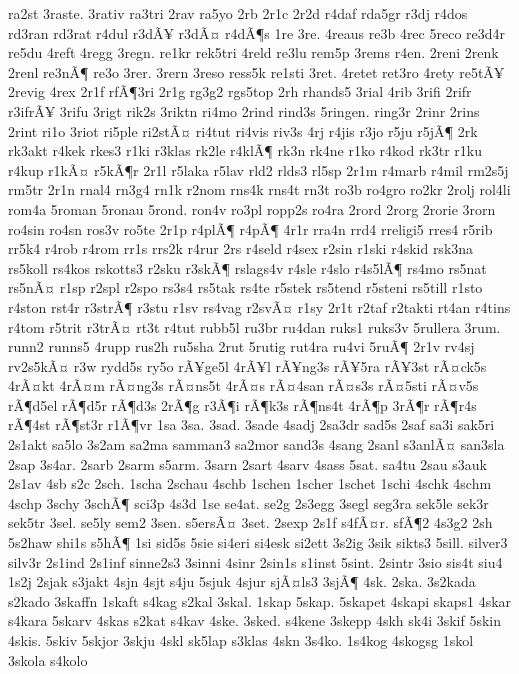 {ra2st
3raste.
3rativ
ra3tri
2rav
ra5yo
2rb
2r1c
2r2d
r4daf
rda5gr
r3dj
r4dos
rd3ran
rd3rat
r4dul
r3dÃ¥
r3dÃ¤
r4dÃ¶s
1re
3re.
4reaus
re3b
4rec
5reco
re3d4r
re5du
4reft
4regg
3regn.
re1kr
rek5tri
4reld
re3lu
rem5p
3rems
r4en.
2reni
2renk
2renl
re3nÃ¶
re3o
3rer.
3rern
3reso
ress5k
re1sti
3ret.
4retet
ret3ro
4rety
re5tÃ¥
2revig
4rex
2r1f
rfÃ¶3ri
2r1g
rg3g2
rgs5top
2rh
rhands5
3rial
4rib
3rifi
2rifr
r3ifrÃ¥
3rifu
3rigt
rik2s
3riktn
ri4mo
2rind
rind3s
5ringen.
ring3r
2rinr
2rins
2rint
ri1o
3riot
ri5ple
ri2stÃ¤
ri4tut
ri4vis
riv3s
4rj
r4jis
r3jo
r5ju
r5jÃ¶
2rk
rk3akt
r4kek
rkes3
r1ki
r3klas
rk2le
r4klÃ¶
rk3n
rk4ne
r1ko
r4kod
rk3tr
r1ku
r4kup
r1kÃ¤
r5kÃ¶r
2r1l
r5laka
r5lav
rld2
rlds3
rl5sp
2r1m
r4marb
r4mil
rm2s5j
rm5tr
2r1n
rnal4
rn3g4
rn1k
r2nom
rns4k
rns4t
rn3t
ro3b
ro4gro
ro2kr
2rolj
rol4li
rom4a
5roman
5ronau
5rond.
ron4v
ro3pl
ropp2s
ro4ra
2rord
2rorg
2rorie
3rorn
ro4sin
ro4sn
ros3v
ro5te
2r1p
r4plÃ¶
r4pÃ¶
4r1r
rra4n
rrd4
rreligi5
rres4
r5rib
rr5k4
r4rob
r4rom
rr1s
rrs2k
r4rur
2rs
r4seld
r4sex
r2sin
r1ski
r4skid
rsk3na
rs5koll
rs4kos
rskotts3
r2sku
r3skÃ¶
rslags4v
r4sle
r4slo
r4s5lÃ¶
rs4mo
rs5nat
rs5nÃ¤
r1sp
r2spl
r2spo
rs3s4
rs5tak
rs4te
r5stek
rs5tend
r5steni
rs5till
r1sto
r4ston
rst4r
r3strÃ¶
r3stu
r1sv
rs4vag
r2svÃ¤
r1sy
2r1t
r2taf
r2takti
rt4an
r4tins
r4tom
r5trit
r3trÃ¤
rt3t
r4tut
rubb5l
ru3br
ru4dan
ruks1
ruks3v
5rullera
3rum.
runn2
runns5
4rupp
rus2h
ru5sha
2rut
5rutig
rut4ra
ru4vi
5ruÃ¶
2r1v
rv4sj
rv2s5kÃ¤
r3w
rydd5s
ry5o
rÃ¥ge5l
4rÃ¥l
rÃ¥ng3s
rÃ¥5ra
rÃ¥3st
rÃ¤ck5s
4rÃ¤kt
4rÃ¤m
rÃ¤ng3s
rÃ¤ns5t
4rÃ¤s
rÃ¤4san
rÃ¤s3s
rÃ¤5sti
rÃ¤v5s
rÃ¶d5el
rÃ¶d5r
rÃ¶d3s
2rÃ¶g
r3Ã¶i
rÃ¶k3s
rÃ¶ns4t
4rÃ¶p
3rÃ¶r
rÃ¶r4s
rÃ¶4st
rÃ¶st3r
r1Ã¶vr
1sa
3sa.
3sad.
3sade
4sadj
2sa3dr
sad5s
2saf
sa3i
sak5ri
2s1akt
sa5lo
3s2am
sa2ma
samman3
sa2mor
sand3s
4sang
2sanl
s3anlÃ¤
san3sla
2sap
3s4ar.
2sarb
2sarm
s5arm.
3sarn
2sart
4sarv
4sass
5sat.
sa4tu
2sau
s3auk
2s1av
4sb
s2c
2sch.
1scha
2schau
4schb
1schen
1scher
1schet
1schi
4schk
4schm
4schp
3schy
3schÃ¶
sci3p
4s3d
1se
se4at.
se2g
2s3egg
3segl
seg3ra
sek5le
sek3r
sek5tr
3sel.
se5ly
sem2
3sen.
s5ersÃ¤
3set.
2sexp
2s1f
s4fÃ¤r.
sfÃ¶2
4s3g2
2sh
5s2haw
shi1s
s5hÃ¶
1si
sid5s
5sie
si4eri
si4esk
si2ett
3s2ig
3sik
sikts3
5sill.
silver3
silv3r
2s1ind
2s1inf
sinne2s3
3sinni
4sinr
2sin1s
s1inst
5sint.
2sintr
3sio
sis4t
siu4
1s2j
2sjak
s3jakt
4sjn
4sjt
s4ju
5sjuk
4sjur
sjÃ¤ls3
3sjÃ¶
4sk.
2ska.
3s2kada
s2kado
3skaffn
1skaft
s4kag
s2kal
3skal.
1skap
5skap.
5skapet
4skapi
skaps1
4skar
s4kara
5skarv
4skas
s2kat
s4kav
4ske.
3sked.
s4kene
3skepp
4skh
sk4i
3skif
5skin
4skis.
5skiv
5skjor
3skju
4skl
sk5lap
s3klas
4skn
3s4ko.
1s4kog
4skogsg
1skol
3skola
s4kolo
}
